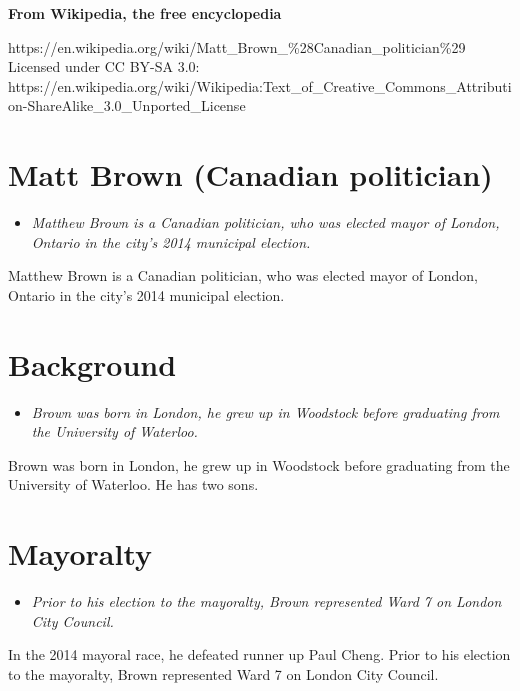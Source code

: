 \textbf{From Wikipedia, the free encyclopedia}

https://en.wikipedia.org/wiki/Matt\_Brown\_\%28Canadian\_politician\%29\\
Licensed under CC BY-SA 3.0:\\
https://en.wikipedia.org/wiki/Wikipedia:Text\_of\_Creative\_Commons\_Attribution-ShareAlike\_3.0\_Unported\_License

\section{Matt Brown (Canadian
politician)}\label{matt-brown-canadian-politician}

\begin{itemize}
\item
  \emph{Matthew Brown is a Canadian politician, who was elected mayor of
  London, Ontario in the city's 2014 municipal election.}
\end{itemize}

Matthew Brown is a Canadian politician, who was elected mayor of London,
Ontario in the city's 2014 municipal election.

\section{Background}\label{background}

\begin{itemize}
\item
  \emph{Brown was born in London, he grew up in Woodstock before
  graduating from the University of Waterloo.}
\end{itemize}

Brown was born in London, he grew up in Woodstock before graduating from
the University of Waterloo. He has two sons.

\section{Mayoralty}\label{mayoralty}

\begin{itemize}
\item
  \emph{Prior to his election to the mayoralty, Brown represented Ward 7
  on London City Council.}
\end{itemize}

In the 2014 mayoral race, he defeated runner up Paul Cheng. Prior to his
election to the mayoralty, Brown represented Ward 7 on London City
Council.


